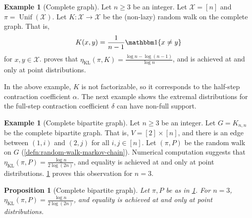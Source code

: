 \documentclass[11pt]{article}
\def\cX{\mathcal{X}}
\DeclareMathOperator\Unif{\mathrm{Unif}}
\DeclareMathOperator\KL{\mathrm{KL}}
\newtheorem{proposition}[theorem]{Proposition}
\theoremstyle{definition}
\newtheorem{example}[theorem]{Example}
\begin{document}
\begin{example}[Complete graph] \label{ex:coloring}
  Let $n\ge 3$ be an integer.
  Let $\cX = [n]$ and $\pi = \Unif(\cX)$.
  Let $K: \cX \to \cX$ be the (non-lazy) random walk on the complete graph. That is,
  \begin{align}
    K(x,y) = \frac 1{n-1} \mathbbm1\{x\ne y\}
  \end{align}
  for $x,y\in \cX$.
  \cite[Prop.~33]{gu2023non} proves that $\eta_{\KL}(\pi, K) = \frac{\log n-\log(n-1)}{\log n}$, and is achieved at and only at point distributions.
\end{example}
In the above example, $K$ is not factorizable, so it corresponds to the half-step contraction coefficient $\alpha$.
The next example shows the extremal distributions for the full-step contraction coefficient $\delta$ can have non-full support.
\begin{example}[Complete bipartite graph] \label{ex:complete-bipartite}
  Let $n\ge 3$ be an integer.
  Let $G=K_{n,n}$ be the complete bipartite graph.
  That is, $V=[2]\times [n]$, and there is an edge between $(1,i)$ and $(2,j)$ for all $i,j\in [n]$.
  Let $(\pi, P)$ be the random walk on $G$ (\cref{defn:random-walk-markov-chain}).
  Numerical computation suggests that $\eta_{\KL}(\pi, P)=\frac{\log n}{2\log(2n)}$, and equality is achieved at and only at point distributions. \cref{prop:complete-bipartite} proves this observation for $n=3$.
\end{example}
\begin{proposition}[Complete bipartite graph] \label{prop:complete-bipartite}
  Let $\pi, P$ be as in \cref{ex:complete-bipartite}. For $n=3$, $\eta_{\KL}(\pi, P)=\frac{\log n}{2\log(2n)}$, and equality is achieved at and only at point distributions.
\end{proposition}
\end{document}
